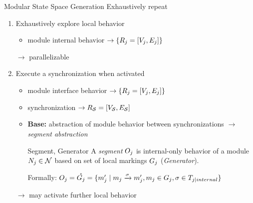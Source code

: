 \documentclass[11pt]{presentation}
\begin{document}
\begin{frame}{Modular State Space Generation}
	Exhaustively repeat

	\begin{enumerate}
		\item[i.] Exhaustively explore local behavior \\
		      \begin{itemize}
			      \item module internal behavior $ \rightarrow \set{\lss{j}[=]} $
		      \end{itemize}
		      $ \rightarrow $ parallelizable
		\item[ii.] Execute a synchronization when activated \\
		      \begin{itemize}
			      \item module interface behavior $ \rightarrow \set{\lss{j}[=]} $
			      \item synchronization $ \rightarrow  R_{\synchronizations}=[V_{\synchronizations},E_{\synchronizations}] $
			      \item[] \textbf{Base:} abstraction of module behavior between synchronizations
			            $ \rightarrow $ \emph{segment abstraction}
			            \begin{defi}{Segment, Generator}{}
				            A \emph{segment} $ \segment[j] $ is internal-only behavior of a module $ \module{j} \in \modules $ based on set of local markings $ \generator[j] $ (\emph{Generator}).

				            Formally: $ \segment[j]= \acc{\generator[j]} = \set{\localmarking{j}^\prime \mid \localmarking{j} \xrightarrow{\sigma} \localmarking{j}^\prime, \localmarking{j} \in \generator[j], \sigma \in \internals[j]}$
			            \end{defi}
		      \end{itemize}
		      $ \rightarrow $ may activate further local behavior
	\end{enumerate}
\end{frame}
\end{document}
